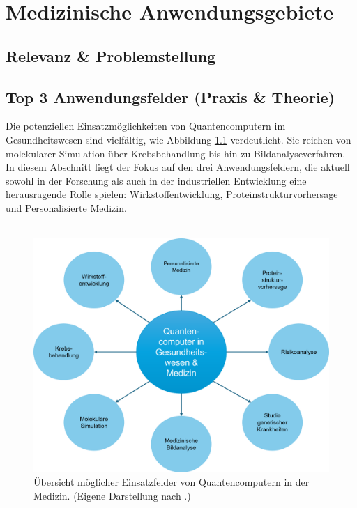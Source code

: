 \chapter{Medizinische Anwendungsgebiete}
\label{trends} %



\section{Relevanz \& Problemstellung}


\section{Top 3 Anwendungsfelder (Praxis \& Theorie)}
\label{med:applicationFields}
Die potenziellen Einsatzmöglichkeiten von Quantencomputern im Gesundheitswesen sind vielfältig, wie Abbildung \ref{fig:use-cases-medicine} verdeutlicht. Sie reichen von molekularer Simulation über Krebsbehandlung bis hin zu Bildanalyseverfahren. In diesem Abschnitt liegt der Fokus auf den drei Anwendungsfeldern, die aktuell sowohl in der Forschung als auch in der industriellen Entwicklung eine herausragende Rolle spielen: Wirkstoffentwicklung, Proteinstrukturvorhersage und Personalisierte Medizin.\\
\\
\begin{figure}[ht]
    \centering
    \includegraphics[width=.8\textwidth]{images/medicine/AnwendungsfelderMedizin.png}
    \caption{Übersicht möglicher Einsatzfelder von Quantencomputern in der Medizin. (Eigene Darstellung nach \cite{dhande_quantum_2023}.)}
    \label{fig:use-cases-medicine}
\end{figure}
